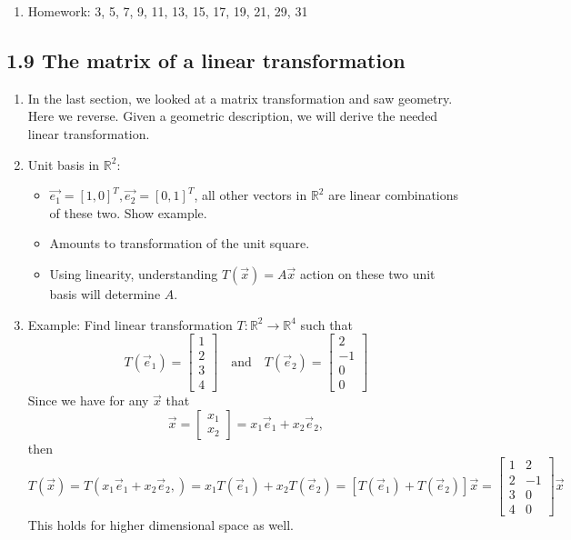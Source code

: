 \documentclass{article}
\begin{document}
\begin{enumerate}
\begin{itemize}
\end{itemize}

\item Homework: 3, 5, 7, 9, 11, 13, 15, 17, 19, 21, 29, 31 	

\end{enumerate}

\subsection{1.9 The matrix of a linear transformation}

\begin{enumerate}

\item In the last section, we looked at a matrix transformation and saw geometry. Here we reverse. Given a geometric description, we will derive the needed linear transformation. 

\item Unit basis in $\mathbb{R}^2$:
\begin{itemize}
\item $\vec{e_1}=[1,0]^T, \vec{e_2}=[0,1]^T$, all other vectors in $\mathbb{R}^2$ are linear combinations of these two. Show example.
\item Amounts to transformation of the unit square.
\item Using linearity, understanding $T(\vec{x})=A\vec{x}$ action on these two unit basis will determine $A$.
\end{itemize} 

\item Example: Find linear transformation $T: \mathbb{R}^2 \rightarrow \mathbb{R}^4$ such that
\[
T(\vec{e}_1) = \left[ \begin{array}{c}
1 \\ 2 \\ 3 \\ 4
\end{array} \right]
\quad \text{and} \quad
T(\vec{e}_2) = \left[ \begin{array}{c}
2 \\ -1 \\ 0 \\ 0
\end{array} \right]
\]
Since we have for any $\vec{x}$ that
\[
\vec{x} = \left[ \begin{array}{c}
x_1 \\ x_2
\end{array} \right]
= x_1 \vec{e}_1 + x_2 \vec{e}_2,
\]
then
\[
T(\vec{x}) = T(x_1 \vec{e}_1 + x_2 \vec{e}_2,)
= x_1 T(\vec{e}_1) + x_2 T(\vec{e}_2) 
= \left[ T(\vec{e}_1) + T(\vec{e}_2) \right] 
\vec{x}
=  \left[ \begin{array}{cc}
1 & 2 \\ 2 & -1 \\ 3 & 0 \\ 4 & 0
\end{array} \right] \vec{x}
\]
This holds for higher dimensional space as well.


\end{enumerate}
\end{document}
